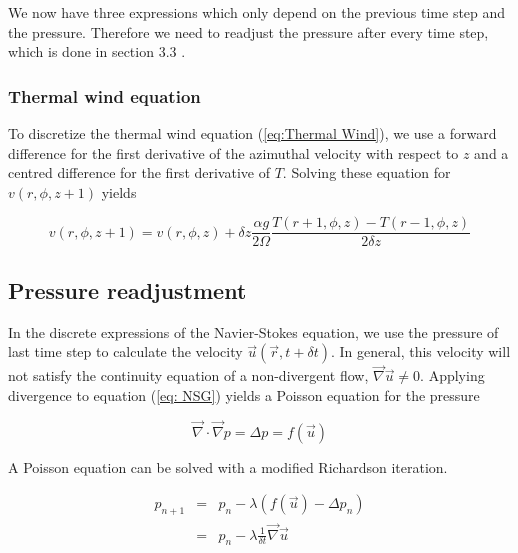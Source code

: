 \documentclass[12pt, a4paper]{article} %
\newcommand{\todoRef}{\todo[color=green!20]}
\begin{document}
			We now have three expressions which only depend on the previous time step and the pressure. Therefore we need to readjust the pressure after every time step, which is done in section 3.3 .
			
		\subsubsection{Thermal wind equation}
			To discretize the thermal wind equation (\ref{eq:Thermal Wind}), we use a forward difference for the first derivative of the azimuthal velocity with respect to $z$ and a centred difference for the first derivative of $T$. Solving these equation for $v(r,\phi, z+1)$ yields
			
			\begin{equation}
				v(r,\phi, z+1) = v(r,\phi,z) + \delta z \frac{\alpha g}{2\Omega} \frac{T(r+1,\phi,z) - T(r-1,\phi, z)}{2 \delta z}
				\label{eq:Discrete Thermal v}
			\end{equation}
		
			
	\subsection{Pressure readjustment} %
		In the discrete expressions of the Navier-Stokes equation, we use the pressure of last time step to calculate the velocity $\vec{u}(\vec{r},t+\delta t)$. In general, this velocity will not satisfy the continuity equation of a non-divergent flow, $\vec{\nabla} \vec{u} \neq 0$. Applying divergence to equation (\ref{eq: NSG}) yields a Poisson equation for the pressure
		
		\begin{equation}
			\vec{\nabla} \cdot \vec{\nabla} p = \Delta p = f(\vec{u})
			\label{eq:Poisson Pressure}
		\end{equation}
		
		A Poisson equation can be solved with a modified Richardson iteration. \todoRef{Fluiddynamik und Wiki}%
		
		\begin{eqnarray}
			p_{n+1} &=& p_n - \lambda \left(f(\vec{u}) - \Delta p_n\right)
			\nonumber \\
			&=& p_n - \lambda \frac{1}{\delta t} \vec{\nabla}\vec{u}
			\label{eq:Drucknachregelung p}
		\end{eqnarray}
		
\end{document}
